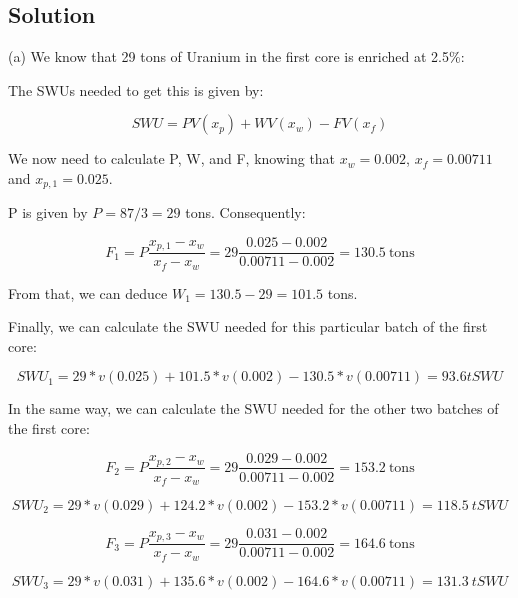 \subsection{Solution}

(a) We know that 29 tons of Uranium in the first core is enriched at 2.5\%:

The SWUs needed to get this is given by:

\begin{equation}
SWU = PV(x_p) + WV(x_w) - FV(x_f)
\end{equation}

We now need to calculate P, W, and F, knowing that $x_w = 0.002$, $x_f = 0.00711$ and $x_{p,1} = 0.025$.

P is given by $P = 87/3 = 29$ tons. Consequently:

\begin{equation}
F_1 = P\frac{x_{p,1} - x_w}{x_f - x_w} = 29\frac{0.025-0.002}{0.00711-0.002} = 130.5\ \text{tons}
\end{equation}

From that, we can deduce $W_1 = 130.5 - 29 = 101.5$ tons.

Finally, we can calculate the SWU needed for this particular batch of the first core:

\begin{equation}
SWU_1 = 29*v(0.025) + 101.5*v(0.002) - 130.5*v(0.00711) = 93.6 tSWU
\end{equation}

In the same way, we can calculate the SWU needed for the other two batches of the first core:

\begin{equation}
F_2 = P\frac{x_{p,2} - x_w}{x_f - x_w} = 29\frac{0.029-0.002}{0.00711-0.002} = 153.2\ \text{tons}
\end{equation}

\begin{equation}
SWU_2 = 29*v(0.029) + 124.2*v(0.002) - 153.2*v(0.00711) = 118.5\ tSWU
\end{equation}



\begin{equation}
F_3 = P\frac{x_{p,3} - x_w}{x_f - x_w} = 29\frac{0.031-0.002}{0.00711-0.002} = 164.6\ \text{tons}
\end{equation}

\begin{equation}
SWU_3 = 29*v(0.031) + 135.6*v(0.002) - 164.6*v(0.00711) = 131.3\ tSWU
\end{equation}

